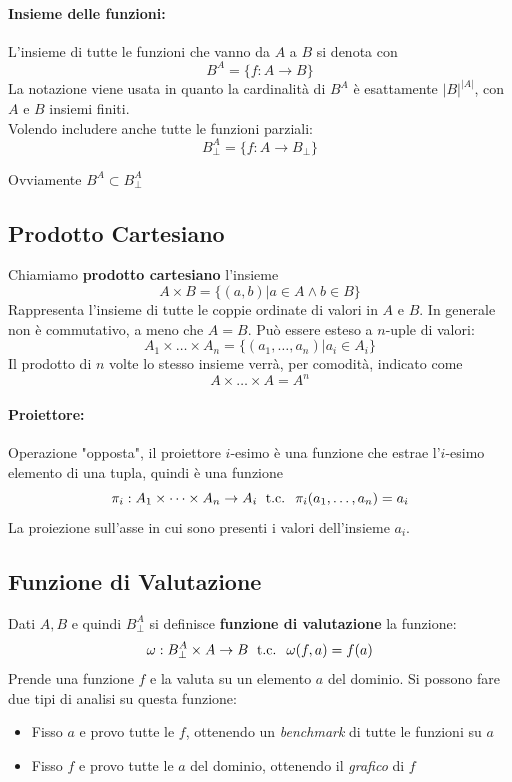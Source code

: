 \paragraph{Insieme delle funzioni:} L'insieme di tutte le funzioni che vanno da $A$ a $B$ si denota con
$$ B^A = \{f: A \rightarrow B \} $$
La notazione viene usata in quanto la cardinalità di $B^A$ è esattamente $|B|^{|A|}$, con $A$ e $B$ insiemi finiti.\\
Volendo includere anche tutte le funzioni parziali: 
$$ B^A_\bot = \{f: A \rightarrow B_\bot \} $$

Ovviamente $B^{A} \subset B^{A}_{\bot}$

\subsection{Prodotto Cartesiano}

Chiamiamo \textbf{prodotto cartesiano} l'insieme 
$$ A \times B = \{(a,b) | a \in A \wedge b \in B \} $$
Rappresenta l'insieme di tutte le coppie ordinate di valori in $A$ e $B$. In generale non è commutativo, a meno che $A=B$. Può essere esteso a $n$-uple di valori:
$$ A_1 \times \dots \times A_n = \{(a_1, \dots, a_n) | a_i \in A_i\} $$
Il prodotto di $n$ volte lo stesso insieme verrà, per comodità, indicato come
$$ A \times \dots \times A = A^n $$

\paragraph{Proiettore:} Operazione "opposta", il proiettore $i$-esimo è una funzione che estrae l'$i$-esimo elemento di una tupla, quindi è una funzione
$$ \pi_i: A_1 \times \dots \times A_n \rightarrow A_i \; \text{ t.c. } \; \pi_i (a_1, \dots, a_n) = a_i $$
La proiezione sull'asse in cui sono presenti i valori dell'insieme $a_i$.

\subsection{Funzione di Valutazione}
Dati $A,B$ e quindi $B^A_\bot$ si definisce \textbf{funzione di valutazione} la funzione:
$$ \omega: B^A_\bot \times A \rightarrow B \; \text{ t.c. } \; \omega (f,a) = f(a) $$
Prende una funzione $f$ e la valuta su un elemento $a$ del dominio. Si possono fare due tipi di analisi su questa funzione: 
\begin{itemize}
	\item Fisso $a$ e provo tutte le $f$, ottenendo un \textit{benchmark} di tutte le funzioni su $a$
	\item Fisso $f$ e provo tutte le $a$ del dominio, ottenendo il \textit{grafico} di $f$
\end{itemize}

